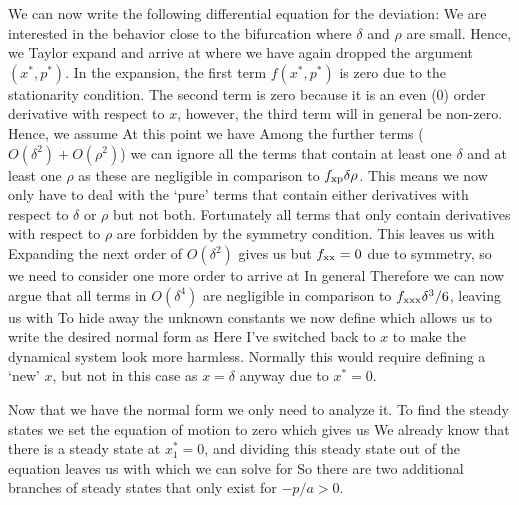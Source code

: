 We can now write the following differential equation for the deviation:
We are interested in the behavior close to the bifurcation where $\delta$ and $\rho$ are small. Hence, we Taylor expand and arrive at
where we have again dropped the argument $(x^*,p^*)$. In the expansion, the first term $f(x^*,p^*)$ is zero due to the stationarity condition. The second term is zero because it is an even (0) order derivative with respect to $x$, however, the third term will in general be non-zero. Hence, we assume 
At this point we have 
Among the further terms ($O(\delta^2) + O(\rho^2)$) we can ignore all the terms that contain at least one $\delta$ and at least one $\rho$ as these are negligible in comparison to $f_{\rm xp}\delta \rho$. This means we now only have to deal with the `pure' terms that contain either derivatives with respect to $\delta$ or $\rho$ but not both. Fortunately all terms that only contain derivatives with respect to $\rho$ are forbidden by the symmetry condition. This leaves us with 
Expanding the next order of $O(\delta^2)$ gives us 
but $f_{\rm xx}=0$ due to symmetry, so we need to consider one more order to arrive at 
In general 
Therefore we can now argue that all terms in $O(\delta^4)$ are negligible in comparison to $ f_{\rm xxx} \delta^3 / 6$, leaving us with 
To hide away the unknown constants we now define 
which allows us to write the desired normal form as 
Here I've switched back to $x$ to make the dynamical system look more harmless. Normally this would require defining a `new' $x$, but not in this case as $x=\delta$ anyway due to $x^*=0$. 

Now that we have the normal form we only need to analyze it. To find the steady states we set the equation of motion to zero which gives us 
We already know that there is a steady state at $x^*_1=0$, and dividing this steady state out of the equation leaves us with 
which we can solve for 
So there are two additional branches of steady states that only exist for $-p/a>0$. 

